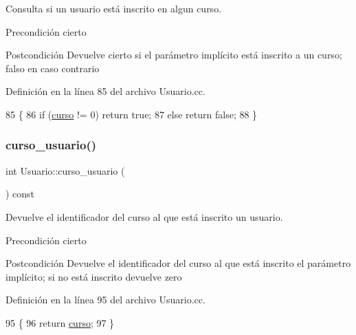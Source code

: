 Consulta si un usuario está inscrito en algun curso. 

\begin{DoxyPrecond}{Precondición}
cierto 
\end{DoxyPrecond}
\begin{DoxyPostcond}{Postcondición}
Devuelve cierto si el parámetro implícito está inscrito a un curso; falso en caso contrario 
\end{DoxyPostcond}


Definición en la línea 85 del archivo Usuario.\+cc.


\begin{DoxyCode}
85                                         \{
86         \textcolor{keywordflow}{if} (\mbox{\hyperlink{class_usuario_aa767fe2d1198f2c97791073bc55803e7}{curso}} != 0) \textcolor{keywordflow}{return} \textcolor{keyword}{true};
87         \textcolor{keywordflow}{else} \textcolor{keywordflow}{return} \textcolor{keyword}{false};
88       \}
\end{DoxyCode}
\mbox{\label{class_usuario_aa8b3fb5f9ab3b36a2173b32b265f19c5}} 
\subsubsection{\texorpdfstring{curso\+\_\+usuario()}{curso\_usuario()}}
{\footnotesize\ttfamily int Usuario\+::curso\+\_\+usuario (\begin{DoxyParamCaption}{ }\end{DoxyParamCaption}) const}



Devuelve el identificador del curso al que está inscrito un usuario. 

\begin{DoxyPrecond}{Precondición}
cierto 
\end{DoxyPrecond}
\begin{DoxyPostcond}{Postcondición}
Devuelve el identificador del curso al que está inscrito el parámetro implícito; si no está inscrito devuelve zero 
\end{DoxyPostcond}


Definición en la línea 95 del archivo Usuario.\+cc.


\begin{DoxyCode}
95                                        \{
96         \textcolor{keywordflow}{return} \mbox{\hyperlink{class_usuario_aa767fe2d1198f2c97791073bc55803e7}{curso}};
97       \}
\end{DoxyCode}
\mbox{\label{class_usuario_a6f9608eac6a6a05d850dcad07bdf37f3}} 
